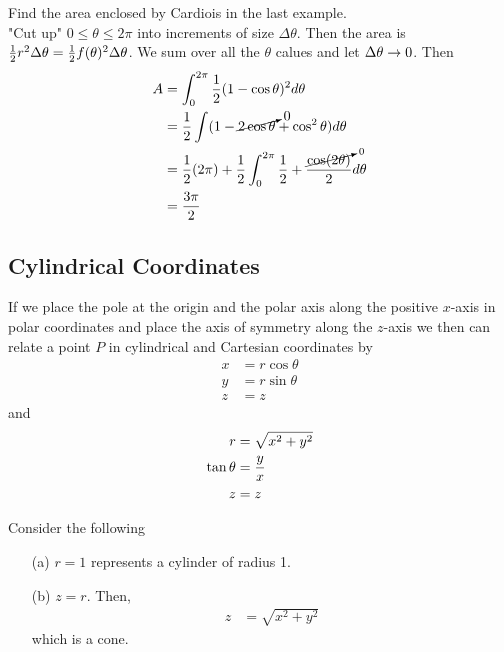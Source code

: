 \documentclass[english, 11pt]{article}
\begin{document}
\begin{exmp}
  Find the area enclosed by Cardiois in the last example. \\

  "Cut up" $0 \leq \theta \leq 2\pi$ into increments of size $\Delta \theta$. Then the area is $\frac{1}{2}r^2\Delta \theta = \frac{1}{2} f(\theta)^2\Delta \theta$. We sum over all the $\theta$ calues and let $\Delta \theta \rightarrow 0$. Then
  \begin{align*}
    A & = \int_0^{2\pi} \frac{1}{2}(1-\cos \theta)^2 d \theta \\
    & = \frac{1}{2} \int (1-\cancelto{0}{2\cos \theta} + \cos^2 \theta) d \theta \\
    & = \frac{1}{2} (2\pi) + \frac{1}{2} \int_0^{2\pi} \frac{1}{2} + \frac{\cancelto{0}{\cos (2\theta)}}{2} d\theta \\
    & = \frac{3\pi}{2}
  \end{align*}
\end{exmp}

\subsection{Cylindrical Coordinates}

If we place the pole at the origin and the polar axis along the positive $x$-axis in polar coordinates and place the axis of symmetry along the $z$-axis we then can relate a point $P$ in cylindrical and Cartesian coordinates by
\begin{align*}
  x & = r\cos \theta \\
  y & = r\sin \theta \\
  z & = z
\end{align*}
and
\begin{align*}
  r & = \sqrt{x^2 + y^2} \\
  \tan \theta & = \frac{y}{x} \\
  z & = z
\end{align*}

\begin{exmp}
  Consider the following
  \begin{itemize}
    \item[(a)] $r = 1$ represents a cylinder of radius 1.
    \item[(b)] $z = r$. Then,
    \begin{align*}
      z & = \sqrt{x^2 + y^2}
    \end{align*}
    which is a cone.
  \end{itemize}
\end{exmp}
\end{document}
